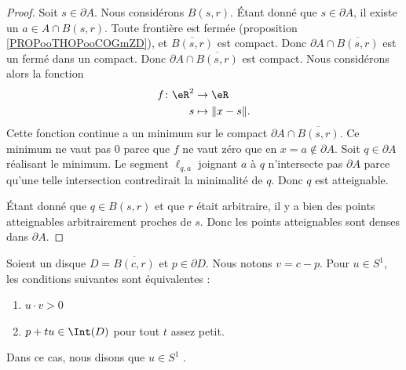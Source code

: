 \begin{proof}
	Soit \( s\in\partial A\). Nous considérons \( B(s,r)\). Étant donné que \( s\in\partial A\), il existe un \( a\in A\cap B(s,r)\). Toute frontière est fermée (proposition \ref{PROPooTHOPooCOGmZD}), et \( \overline{B(s,r)} \) est compact. Donc \( \partial A\cap\overline{B(s,r)}\) est un fermé dans un compact. Donc \( \partial A\cap\overline{B(s,r)}\) est compact. Nous considérons alors la fonction
	\begin{equation}
		\begin{aligned}
			f\colon \eR^2 & \to \eR            \\
			s             & \mapsto \| x-s \|.
		\end{aligned}
	\end{equation}
	Cette fonction continue a un minimum sur le compact \( \partial A\cap\overline{B(s,r)}\). Ce minimum ne vaut pas \( 0\) parce que \( f\) ne vaut zéro que en \( x=a\not\in \partial A\). Soit \( q\in \partial A\) réalisant le minimum. Le segment \( \ell_{q,a}\) joignant \( a\) à \( q\) n'intersecte pas \( \partial A\) parce qu'une telle intersection contredirait la minimalité de \( q\). Donc \( q\) est atteignable.

	Étant donné que \( q\in B(s,r)\) et que \( r\) était arbitraire, il y a bien des points atteignables arbitrairement proches de \( s\). Donc les points atteignables sont denses dans \( \partial A\).
\end{proof}


\begin{propositionDef}	\label{PROPooWLQEooYpufqW}
	Soient un disque \( D=\overline{B(c,r)}\) et \( p\in \partial D\). Nous notons \( v=c-p\). Pour \( u\in S^1\), les conditions suivantes sont équivalentes :
	\begin{enumerate}
		\item
		      \( u\cdot v>0\)
		\item
		      \( p+tu\in \Int(D)\) pour tout \( t\) assez petit.
	\end{enumerate}
	Dans ce cas, nous disons que \( u\in S^1\) .
\end{propositionDef}

